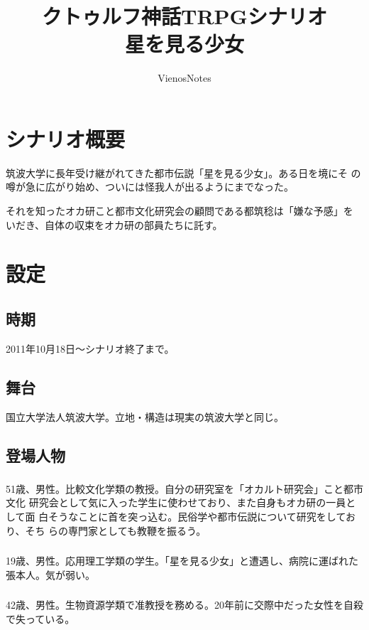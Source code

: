 \documentclass[a4paper,8pt,min]{jsarticle}
\title{{\large{クトゥルフ神話TRPGシナリオ}}\\ 星を見る少女
}
\author{VienosNotes}
\begin{document}
\maketitle
\thispagestyle{empty}
\newpage
\setcounter{page}{1}
\section{シナリオ概要}
筑波大学に長年受け継がれてきた都市伝説「星を見る少女」。ある日を境にそ
の噂が急に広がり始め、ついには怪我人が出るようにまでなった。

それを知ったオカ研こと都市文化研究会の顧問である都筑稔は「嫌な予感」を
いだき、自体の収束をオカ研の部員たちに託す。

\section{設定}
\subsection{時期}
2011年10月18日〜シナリオ終了まで。

\subsection{舞台}
国立大学法人筑波大学。立地・構造は現実の筑波大学と同じ。

\subsection{登場人物}
\subsubsection{}
51歳、男性。比較文化学類の教授。自分の研究室を「オカルト研究会」こと都市文化
研究会として気に入った学生に使わせており、また自身もオカ研の一員として面
白そうなことに首を突っ込む。民俗学や都市伝説について研究をしており、そち
らの専門家としても教鞭を振るう。

\subsubsection{}
19歳、男性。応用理工学類の学生。「星を見る少女」と遭遇し、病院に運ばれた
張本人。気が弱い。

\subsubsection{}
42歳、男性。生物資源学類で准教授を務める。20年前に交際中だった女性を自殺
で失っている。
\end{document}

